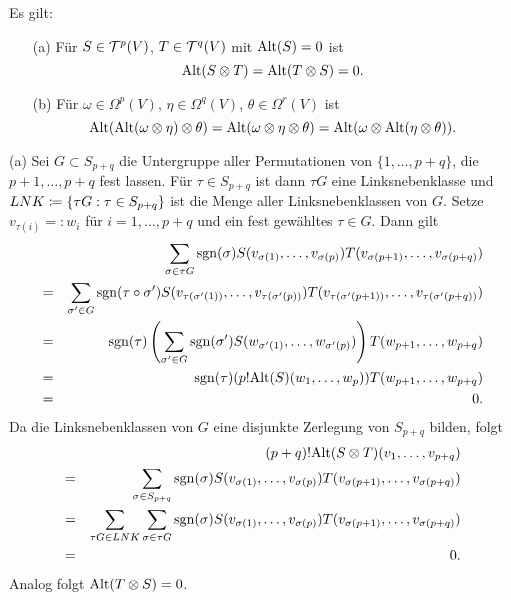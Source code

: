 \documentclass[a4paper,twoside,DIV15,BCOR12mm]{scrbook}
\DeclareMathOperator{\sgn}{sgn}
\begin{document}
\bigskip

\begin{lemma}\label{Lemma3.3.4} {Es gilt:}
\begin{enumerate}
\item[{\rm (a)}] {Für $S \in {\cal T}^{p}(V)$, $T \in {\cal T}^{q}(V)$ mit 
${\rm Alt}(S) = 0$ ist}
\[ {\rm Alt}(S \otimes T) = {\rm Alt}(T \otimes S) = 0. \]
\item[{\rm (b)}] {Für $\omega \in \Omega^{p}(V)$, $\eta \in \Omega^{q}(V)$, 
$\theta \in \Omega^{r}(V)$ ist}
\[ {\rm Alt}({\rm Alt}(\omega \otimes \eta) \otimes \theta) = {\rm 
Alt}(\omega \otimes \eta \otimes \theta) = {\rm Alt}(\omega \otimes 
{\rm Alt}(\eta \otimes \theta)). \]
\end{enumerate}
\end{lemma}

\bigskip

 (a) Sei $G \subset S_{p+q}$ die Untergruppe 
aller Permutationen von $\{1,\dots,p+q\}$, die $p+1,\dots,p+q$ fest 
lassen. Für $\tau \in S_{p+q}$ ist dann $\tau G$ eine 
Linksnebenklasse und $LNK \da  \{\tau G: \tau \in S_{p+q}\}$ ist die 
Menge aller Linksnebenklassen von $G$. Setze $v_{\tau(i)} =: 
w_{i}$ für $i = 1,\dots,p+q$ und ein fest gewähltes $\tau \in 
G$. Dann gilt
\begin{eqnarray*}
&   & \sum_{\sigma \in \tau G} \sgn (\sigma) 
S(v_{\sigma(1)},\dots,v_{\sigma(p)}) 
T(v_{\sigma(p+1)},\dots,v_{\sigma(p+q)}) \\
& = & \sum_{\sigma' \in G} \sgn (\tau \circ \sigma') 
S(v_{\tau(\sigma'(1))},\dots,v_{\tau(\sigma'(p))}) 
T(v_{\tau(\sigma'(p+1))},\dots,v_{\tau(\sigma'(p+q))}) \\
& = & \sgn (\tau) \left(\sum_{\sigma' \in G} \sgn (\sigma') 
S(w_{\sigma'(1)},\dots,w_{\sigma'(p)})\right) 
T(w_{p+1},\dots,w_{p+q}) \\
& = & \sgn (\tau) (p! {\rm 
Alt}(S)(w_{1},\dots,w_{p}))T(w_{p+1},\dots,w_{p+q}) \\
& = & 0.
\end{eqnarray*}
Da die Linksnebenklassen von $G$ eine disjunkte Zerlegung von 
$S_{p+q}$ bilden, folgt
\begin{eqnarray*}
&   & (p+q)! {\rm Alt}(S \otimes T)(v_{1},\dots,v_{p+q}) \\
& = & \sum_{\sigma \in S_{p+q}} \sgn (\sigma) 
S(v_{\sigma(1)},\dots,v_{\sigma(p)}) 
T(v_{\sigma(p+1)},\dots,v_{\sigma(p+q)}) \\
& = & \sum_{\tau G \in LNK} \sum_{\sigma \in \tau G} {\rm 
sgn}(\sigma) S(v_{\sigma(1)},\dots,v_{\sigma(p)}) 
T(v_{\sigma(p+1)},\dots,v_{\sigma(p+q)}) \\
& = & 0.
\end{eqnarray*}
Analog folgt ${\rm Alt}(T \otimes S) = 0$.\\
\end{document}

